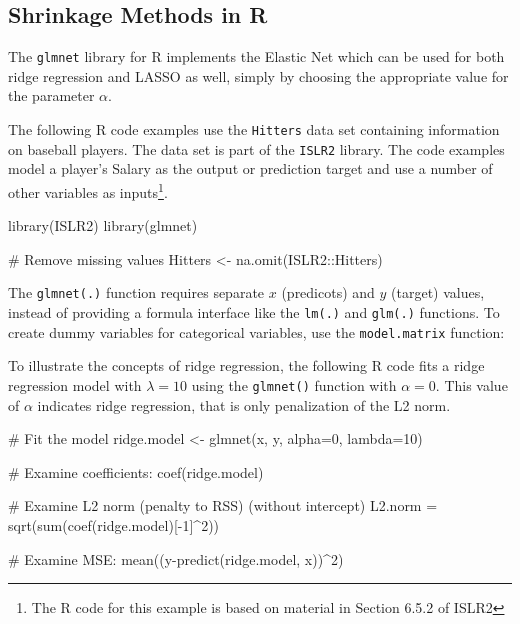 \begin{withcode}
\section{Shrinkage Methods in R}

The \texttt{glmnet} library for R implements the Elastic Net which can be used for both ridge regression and LASSO as well, simply by choosing the appropriate value for the parameter $\alpha$.

The following R code examples use the \texttt{Hitters} data set containing information on baseball players. The data set is part of the \texttt{ISLR2} library. The code examples model a player's Salary as the output or prediction target and use a number of other variables as inputs\footnote{The R code for this example is based on material in Section 6.5.2 of ISLR2}. 

\begin{Rcode}
library(ISLR2)
library(glmnet)

# Remove missing values
Hitters <- na.omit(ISLR2::Hitters)
\end{Rcode}

The \texttt{glmnet(.)} function requires separate $x$ (predicots) and $y$  (target) values, instead of providing a formula interface like the \texttt{lm(.)} and \texttt{glm(.)} functions. To create dummy variables for categorical variables, use the \texttt{model.matrix} function:


\noindent To illustrate the concepts of ridge regression, the following R code fits a ridge regression model with $$ using the \texttt{glmnet()} function with $$. This value of $\alpha$ indicates ridge regression, that is only penalization of the L2 norm. 


\begin{Rcode}
# Fit the model
ridge.model <- glmnet(x, y, alpha=0, lambda=10)

# Examine coefficients:
coef(ridge.model)

# Examine L2 norm (penalty to RSS) (without intercept)
L2.norm = sqrt(sum(coef(ridge.model)[-1]^2))

# Examine MSE:
mean((y-predict(ridge.model, x))^2)
\end{Rcode}


\end{withcode}
